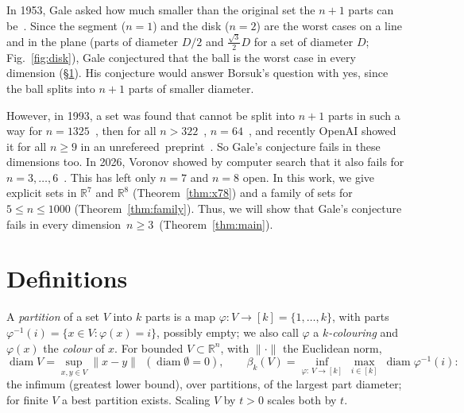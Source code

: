 \documentclass[10pt,a4paper,reqno]{amsart}
\newcommand{\R}{\mathbb R}
\DeclareMathOperator{\diam}{diam}
\begin{document}
In 1953, Gale asked how much smaller than the original set the $n+1$ parts can be~\cite{Ga53}. Since the segment ($n=1$) and the disk ($n=2$) are the worst cases on a line and in the plane (parts of diameter $D/2$ and $\frac{\sqrt3}{2}D$ for a set of diameter $D$; Fig.~\ref{fig:disk}), Gale conjectured that the ball is the worst case in every dimension (\S\ref{sec:def}). His conjecture would answer Borsuk's question with yes, since the ball splits into $n+1$ parts of smaller diameter.

However, in 1993, a set was found that cannot be split into $n+1$ parts in such a way for $n = 1325$~\cite{KK93}, then for all $n > 322$~\cite{Hi02}, $n = 64$~\cite{JB14}, and recently OpenAI showed it for all $n \ge 9$ in an unrefereed~preprint~\cite{OAI26}. So Gale's conjecture fails in these dimensions too. In 2026, Voronov showed by computer search that it also fails for $n=3,\dots,6$~\cite{Vo26}. This has left only $n=7$ and $n=8$ open. In this work, we give explicit sets in $\R^7$ and $\R^8$ (Theorem~\ref{thm:x78}) and a family of sets for $5\le n\le 1000$ (Theorem~\ref{thm:family}). Thus, we will show that Gale's conjecture fails in every dimension~$n\ge 3$~(Theorem~\ref{thm:main}).

\section{Definitions}\label{sec:def}

A \emph{partition} of a set $V$ into $k$ parts is a map $\varphi:V\to[k]=\{1,\dots,k\}$, with parts $\varphi^{-1}(i)=\{x\in V:\varphi(x)=i\}$, possibly empty; we also call $\varphi$ a \emph{$k$-colouring} and $\varphi(x)$ the \emph{colour} of $x$. For bounded $V\subset\R^n$, with $\|\cdot\|$ the Euclidean norm,
\[
\diam V=\sup_{x,y\in V}\|x-y\|\ \ (\diam\emptyset=0),\qquad
\beta_k(V)=\inf_{\varphi:\,V\to[k]}\ \max_{i\in[k]}\ \diam \varphi^{-1}(i):
\]
the infimum (greatest lower bound), over partitions, of the largest part diameter; for finite $V$ a best partition exists. Scaling $V$ by $t>0$ scales both by $t$.
\end{document}
